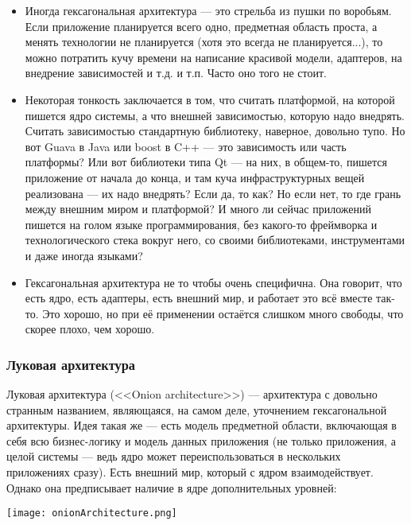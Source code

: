 \documentclass{../../text-style}
\begin{document}
\begin{itemize}
    \item Иногда гексагональная архитектура --- это стрельба из пушки по воробьям. Если приложение планируется всего одно, предметная область проста, а менять технологии не планируется (хотя это всегда не планируется...), то можно потратить кучу времени на написание красивой модели, адаптеров, на внедрение зависимостей и т.д. и т.п. Часто оно того не стоит.
    \item Некоторая тонкость заключается в том, что считать платформой, на которой пишется ядро системы, а что внешней зависимостью, которую надо внедрять. Считать зависимостью стандартную библиотеку, наверное, довольно тупо. Но вот Guava в Java или boost в C++ --- это зависимость или часть платформы? Или вот библиотеки типа Qt --- на них, в общем-то, пишется приложение от начала до конца, и там куча инфраструктурных вещей реализована --- их надо внедрять? Если да, то как? Но если нет, то где грань между внешним миром и платформой? И много ли сейчас приложений пишется на голом языке программирования, без какого-то фреймворка и технологического стека вокруг него, со своими библиотеками, инструментами и даже иногда языками?
    \item Гексагональная архитектура не то чтобы очень специфична. Она говорит, что есть ядро, есть адаптеры, есть внешний мир, и работает это всё вместе так-то. Это хорошо, но при её применении остаётся слишком много свободы, что скорее плохо, чем хорошо.
\end{itemize}

\subsubsection{Луковая архитектура}

Луковая архитектура (<<Onion architecture>>) --- архитектура с довольно странным названием, являющаяся, на самом деле, уточнением гексагональной архитектуры. Идея такая же --- есть модель предметной области, включающая в себя всю бизнес-логику и модель данных приложения (не только приложения, а целой системы --- ведь ядро может переиспользоваться в нескольких приложениях сразу). Есть внешний мир, который с ядром взаимодействует. Однако она предписывает наличие в ядре дополнительных уровней:

\begin{center}
    \texttt{[image: onionArchitecture.png]}
\end{center}
\end{document}
